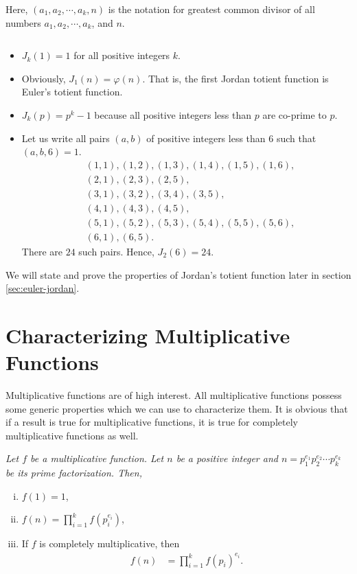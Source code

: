 \documentclass[12pt]{subfile}
\begin{document}
		\begin{note}
			Here, $(a_1,a_2,\cdots,a_k,n)$ is the notation for greatest common divisor of all numbers $a_1,a_2,\cdots,a_k$, and $n$.
		\end{note}
		
		\begin{example}
			$ $
			\begin{itemize}
				\item $J_k(1)=1$ for all positive integers $k$.
				\item Obviously, $J_1(n)=\varphi(n)$. That is, the first Jordan totient function is Euler's totient function.
				\item $J_k(p)=p^k - 1 $ because all positive integers less than $p$ are co-prime to $p$.
				\item Let us write all pairs $(a,b)$ of positive integers less than $6$ such that $(a,b,6)=1$.
					\begin{align*}
						&(1,1), (1,2), (1, 3), (1, 4), (1, 5), (1,6),\\
						&(2,1), (2,3), (2,5),\\
						&(3,1), (3,2), (3,4), (3,5),\\
						&(4,1), (4,3), (4,5),\\
						&(5,1), (5,2), (5,3), (5,4), (5,5), (5,6),\\
						&(6,1), (6,5).
					\end{align*}
				There are $24$ such pairs. Hence, $J_2(6)=24$.
			\end{itemize}
		\end{example}
		

We will state and prove the properties of Jordan's totient function later in section \eqref{sec:euler-jordan}.

\section{Characterizing Multiplicative Functions} \label{sec:characterizing-multiplicative}
	Multiplicative functions are of high interest. All multiplicative functions possess some generic properties which we can use to characterize them. It is obvious that if a result is true for multiplicative functions, it is true for completely multiplicative functions as well.
		\begin{proposition}\slshape
			Let $f$ be a multiplicative function. Let $n$ be a positive integer and $n=p_1^{e_1}p_2^{e_2}\cdots p_k^{e_k}$ be its prime factorization. Then,
				\begin{enumerate}[i.]
					\item $f(1)=1$,
					\item $\displaystyle f(n) = \prod_{i=1}^{k}f(p_i^{e_i})$,
					\item If $f$ is completely multiplicative, then
						\begin{align*}
							f(n) & = \prod_{i=1}^{k}f(p_i)^{e_i}.
						\end{align*}
				\end{enumerate}
		\end{proposition}
		
\end{document}
